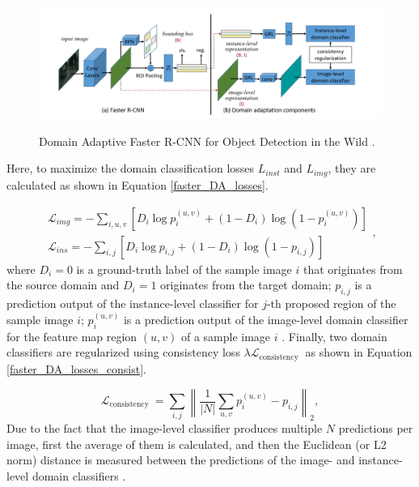\begin{figure}[htb]
	\begin{center}
		\includegraphics[width=16cm]{./faster_rcnn_DA.png}
	\end{center}
	\caption{Domain Adaptive Faster R-CNN for Object Detection in the Wild \cite{Chen2018}.}
	\begin{center}
		\label{Faster_rcnn_DA}
	\end{center}
\end{figure}

Here, to maximize the domain classification losses $L_{inst}$ and $L_{img}$, they are calculated as shown in Equation \ref{faster_DA_losses}. 

\begin{equation}
\label{faster_DA_losses} 
\begin{gathered}
\mathcal{L}_{i m g}=-\sum_{i, u, v}\left[D_{i} \log p_{i}^{(u, v)}+\left(1-D_{i}\right) \log \left(1-p_{i}^{(u, v)}\right)\right] \\ 
\mathcal{L}_{i n s} = -\sum_{i, j}\left[D_{i} \log p_{i, j}+\left(1-D_{i}\right) \log \left(1-p_{i, j}\right)\right]
\end{gathered}
, 
\end{equation}
where $D_i=0$ is a ground-truth label of the sample image $i$ that originates from  the source domain and $D_i=1$ originates from the target domain; $p_{i,j}$ is a prediction output of the instance-level classifier for $j$-th proposed region of the sample image $i$; $p_{i}^{(u, v)}$ is a prediction output of the image-level domain classifier for the feature map region $(u,v)$ of a sample image $i$ \cite{Chen2018}. 
Finally, two domain classifiers are regularized using consistency loss $\lambda \mathcal{L}_{\text {consistency }}$ \cite{Chen2018} as shown in Equation \ref{faster_DA_losses_consist}.  

\begin{equation}
\label{faster_DA_losses_consist} 
\mathcal{L}_{\text {consistency }}=\sum_{i, j}\left\|\frac{1}{|N|} \sum_{u, v} p_{i}^{(u, v)}-p_{i, j}\right\|_{2}
, 
\end{equation}
Due to the fact that the image-level classifier produces multiple $N$ predictions per image, first the average of them is calculated, and then the Euclidean (or L2 norm) distance is measured between the predictions of the image- and instance-level domain classifiers \cite{Chen2018}. 

